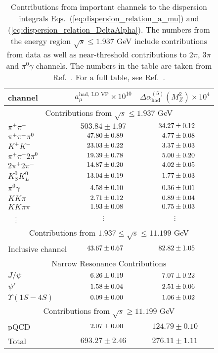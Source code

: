 \begin{table} 
\caption{Contributions from important channels to the 
dispersion integrals Eqs.~(\ref{eq:dispersion_relation_a_mu})
and (\ref{eq:dispersion_relation_DeltaAlpha}).
The numbers from the energy region $\sqrt{s} \leq 1.937$ GeV
include contributions from data as well as near-threshold
contributions to $2\pi$, $3\pi$ and $\pi^0\gamma$ channels.
The numbers in the table are taken from Ref.~\cite{KNT18}.
For a full table, see Ref.~\cite{KNT18}.}
%
\label{table:contributions}
%
\begin{center} \begin{tabular}{|l|c|c|}
\hline
channel        & $a_\mu^{\text{had, LO VP}} \times 10^{10}$
               & $\Delta \alpha_{\text{had}}^{(5)}(M_Z^2)\times 10^4$ \\
\hline
\multicolumn{3}{|c|}{Contributions from $\sqrt{s} \leq 1.937$ GeV} \\
\hline
$\pi^+\pi^-$   & $503.84 \pm 1.97$     & $\hpz34.27 \pm 0.12$ \\
$\pi^+\pi^-\pi^0$
               & $\hpz47.80 \pm 0.89$  & $\hpzz4.77 \pm 0.08$ \\
$K^+ K^-$      & $\hpz23.03 \pm 0.22$  & $\hpzz3.37 \pm 0.03$ \\
$\pi^+ \pi^- 2\pi^0$
               & $\hpz19.39 \pm 0.78$  & $\hpzz5.00 \pm 0.20$ \\
$2\pi^+ 2\pi^-$& $\hpz14.87 \pm 0.20$  & $\hpzz4.02 \pm 0.05$ \\
$K_S^0 K_L^0$  & $\hpz13.04 \pm 0.19$  & $\hpzz1.77 \pm 0.03$ \\
$\pi^0 \gamma$ & $\hpzz4.58 \pm 0.10$  & $\hpzz0.36 \pm 0.01$ \\
$KK\pi$        & $\hpzz2.71 \pm 0.12$  & $\hpzz0.89 \pm 0.04$ \\
$KK\pi\pi$     & $\hpzz1.93 \pm 0.08$  & $\hpzz0.75 \pm 0.03$ \\
$\hpzz\vdots$  &  $\vdots$  &  $\vdots$   \\
\hline 
\multicolumn{3}{|c|}{Contributions from
  $1.937 \leq \sqrt{s} \leq 11.199$ GeV} \\
\hline
Inclusive channel & $\hpz43.67 \pm 0.67$  & $\hpz82.82 \pm 1.05$ \\
\hline
\multicolumn{3}{|c|}{Narrow Resonance Contributions} \\
\hline
$J/\psi$          & $\hpzz6.26 \pm 0.19$  & $\hpzz7.07 \pm 0.22$ \\
$\psi'$           & $\hpzz1.58 \pm 0.04$  & $\hpzz2.51 \pm 0.06$ \\
$\Upsilon(1S-4S)$ & $\hpzz0.09 \pm 0.00$  & $\hpzz1.06 \pm 0.02$ \\
\hline 
\multicolumn{3}{|c|}{Contributions from $\sqrt{s} \geq 11.199$ GeV} \\
\hline
pQCD              & $\hpzz2.07 \pm 0.00$  & $124.79 \pm 0.10$ \\
\hline\hline
Total             & $693.27 \pm 2.46$     & $276.11 \pm 1.11$  \\
\hline
\end{tabular} \end{center} \end{table}

